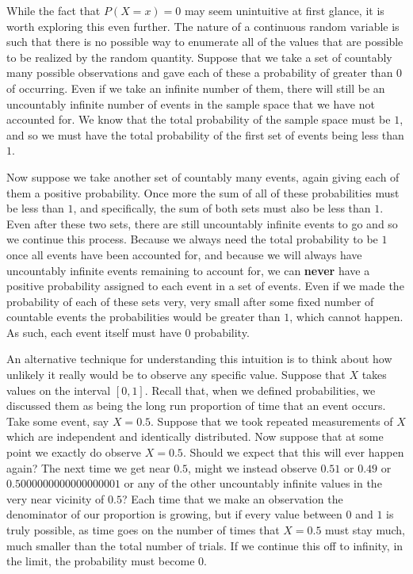 \documentclass[
  letterpaper,
  DIV=11,
  numbers=noendperiod]{scrreprt}
\theoremstyle{definition}
\theoremstyle{definition}
\theoremstyle{definition}
\theoremstyle{remark}
\begin{document}
\begin{tcolorbox}[enhanced jigsaw, coltitle=black, colframe=quarto-callout-note-color-frame, colbacktitle=quarto-callout-note-color!10!white, bottomrule=.15mm, opacitybacktitle=0.6, colback=white, toptitle=1mm, arc=.35mm, leftrule=.75mm, bottomtitle=1mm, opacityback=0, breakable, rightrule=.15mm, title={Singleton Probabilities with Continuous Random Variables}, left=2mm, titlerule=0mm, toprule=.15mm]

While the fact that \(P(X=x) = 0\) may seem unintuitive at first glance,
it is worth exploring this even further. The nature of a continuous
random variable is such that there is no possible way to enumerate all
of the values that are possible to be realized by the random quantity.
Suppose that we take a set of countably many possible observations and
gave each of these a probability of greater than \(0\) of occurring.
Even if we take an infinite number of them, there will still be an
uncountably infinite number of events in the sample space that we have
not accounted for. We know that the total probability of the sample
space must be \(1\), and so we must have the total probability of the
first set of events being less than \(1\)\footnotemark{}.

Now suppose we take another set of countably many events, again giving
each of them a positive probability. Once more the sum of all of these
probabilities must be less than \(1\), and specifically, the sum of both
sets must also be less than \(1\). Even after these two sets, there are
still uncountably infinite events to go and so we continue this process.
Because we always need the total probability to be \(1\) once all events
have been accounted for, and because we will always have uncountably
infinite events remaining to account for, we can \textbf{never} have a
positive probability assigned to each event in a set of events. Even if
we made the probability of each of these sets very, very
small\footnotemark{} after some fixed number of countable events the
probabilities would be greater than \(1\), which cannot happen. As such,
each event itself must have \(0\) probability.

An alternative technique for understanding this intuition is to think
about how unlikely it really would be to observe any specific value.
Suppose that \(X\) takes values on the interval \([0,1]\). Recall that,
when we defined probabilities, we discussed them as being the long run
proportion of time that an event occurs. Take some event, say \(X=0.5\).
Suppose that we took repeated measurements of \(X\) which are
independent and identically distributed. Now suppose that at some point
we exactly do observe \(X=0.5\). Should we expect that this will ever
happen again? The next time we get near \(0.5\), might we instead
observe \(0.51\) or \(0.49\) or \(0.5000000000000000001\) or any of the
other uncountably infinite values in the very near vicinity of \(0.5\)?
Each time that we make an observation the denominator of our proportion
is growing, but if every value between \(0\) and \(1\) is truly
possible, as time goes on the number of times that \(X=0.5\) must stay
much, much smaller than the total number of trials. If we continue this
off to infinity, in the limit, the probability must become \(0\).


\end{tcolorbox}
\end{document}
